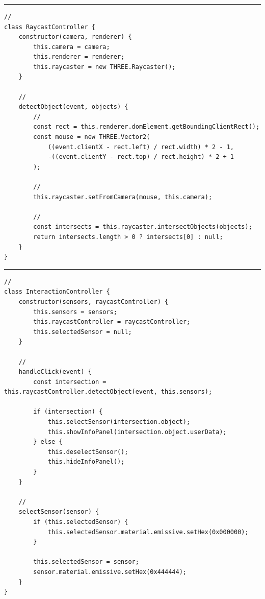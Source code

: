 \subsubsection{}\label{section-7}

\begin{center}\rule{0.5\linewidth}{0.5pt}\end{center}

\begin{verbatim}
// 
class RaycastController {
    constructor(camera, renderer) {
        this.camera = camera;
        this.renderer = renderer;
        this.raycaster = new THREE.Raycaster();
    }
    
    // 
    detectObject(event, objects) {
        // 
        const rect = this.renderer.domElement.getBoundingClientRect();
        const mouse = new THREE.Vector2(
            ((event.clientX - rect.left) / rect.width) * 2 - 1,
            -((event.clientY - rect.top) / rect.height) * 2 + 1
        );
        
        // 
        this.raycaster.setFromCamera(mouse, this.camera);
        
        // 
        const intersects = this.raycaster.intersectObjects(objects);
        return intersects.length > 0 ? intersects[0] : null;
    }
}
\end{verbatim}

\begin{center}\rule{0.5\linewidth}{0.5pt}\end{center}

\begin{verbatim}
// 
class InteractionController {
    constructor(sensors, raycastController) {
        this.sensors = sensors;
        this.raycastController = raycastController;
        this.selectedSensor = null;
    }
    
    // 
    handleClick(event) {
        const intersection = this.raycastController.detectObject(event, this.sensors);
        
        if (intersection) {
            this.selectSensor(intersection.object);
            this.showInfoPanel(intersection.object.userData);
        } else {
            this.deselectSensor();
            this.hideInfoPanel();
        }
    }
    
    // 
    selectSensor(sensor) {
        if (this.selectedSensor) {
            this.selectedSensor.material.emissive.setHex(0x000000);
        }
        
        this.selectedSensor = sensor;
        sensor.material.emissive.setHex(0x444444);
    }
}
\end{verbatim}

